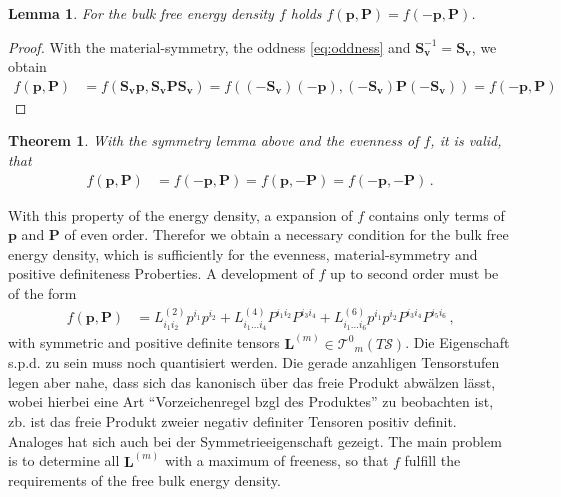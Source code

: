 \documentclass{scrartcl}
\newcommand{\germanred}[1]{{\color{red}\selectlanguage{ngerman}#1\selectlanguage{english}}}
\newcommand{\formComma}{\,\text{,}}
\newcommand{\formPeriod}{\,\text{.}}
\newcommand{\pb}{\mathbf{p}}%
\newcommand{\vb}{\mathbf{v}}%
\newcommand{\Pb}{\mathbf{P}}%
\newcommand{\Lb}{\mathbf{L}}%
\newcommand{\surf}{\mathcal{S}}
\newcommand{\Sb}{\mathbf{S}}
\newcommand{\sftensor}[3]{{{#1}^{#2}}_{#3}}
\newtheorem{theorem}{Theorem}
\newtheorem{lemma}{Lemma}
\begin{document}
      \begin{lemma}
        For the bulk free energy density \( f \) holds \( f(\pb,\Pb) = f(-\pb,\Pb) \).
      \end{lemma}
      \begin{proof}
        With the material-symmetry, the oddness \eqref{eq:oddness} and \( \Sb_{\vb}^{-1} = \Sb_{\vb} \), we
        obtain
        \begin{align}
          f(\pb,\Pb) &= f( \Sb_{\vb}\pb, \Sb_{\vb}\Pb \Sb_{\vb})
                      = f( (-\Sb_{\vb})(-\pb), (-\Sb_{\vb})\Pb (-\Sb_{\vb}))
                      = f(-\pb,\Pb)
        \end{align}
      \end{proof}
      \begin{theorem}
        With the symmetry lemma above and the evenness of \( f \), it is valid, that
        \begin{align}
          f(\pb,\Pb) &= f(-\pb,\Pb) = f(\pb,-\Pb) = f(-\pb,-\Pb) \formPeriod
        \end{align}
      \end{theorem}
      With this property of the energy density, a expansion of \( f \) contains only terms of \( \pb \)
      and \( \Pb \) of even order.
      Therefor we obtain a necessary condition for the bulk free energy density,
      which is sufficiently for the evenness, material-symmetry and positive definiteness Proberties. 
      A development of \( f \) up to second order must be of the form
      \begin{align}\label{eq:prototype}
        f(\pb,\Pb) &= L^{(2)}_{i_{1}i_{2}}p^{i_{1}}p^{i_{2}}
                        + L^{(4)}_{i_{1}\ldots i_{4}}P^{i_{1}i_{2}}P^{i_{3}i_{4}}
                        + L^{(6)}_{i_{1}\ldots i_{6}} p^{i_{1}}p^{i_{2}}P^{i_{3}i_{4}}P^{i_{5}i_{6}} \formComma
      \end{align}
      with symmetric and positive definite tensors \( \Lb^{(m)}\in\sftensor{\mathcal{T}}{0}{m}(T\surf) \).
      \germanred{Die Eigenschaft s.p.d. zu sein muss noch quantisiert werden.
      Die gerade anzahligen Tensorstufen legen aber nahe, dass sich das kanonisch über das freie Produkt abwälzen lässt,
      wobei hierbei eine Art "`Vorzeichenregel bzgl des Produktes"' zu beobachten ist, 
      zb. ist das freie Produkt zweier negativ definiter Tensoren positiv
      definit. Analoges hat sich auch bei der Symmetrieeigenschaft gezeigt.}
      The main problem is to determine all \( \Lb^{(m)} \) with a maximum of freeness, 
      so that \( f \) fulfill the requirements of the free bulk energy density.
\end{document}
